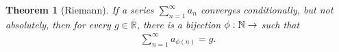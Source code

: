 \documentclass[11pt]{book}
\newtheorem{theorem}{Theorem}[chapter]
\theoremstyle{definition}
\numberwithin{equation}{chapter}
\begin{document}
\medskip

\begin{theorem}[Riemann]
If a series $\sum^\infty_{n=1} a_n$ converges conditionally, but not absolutely, then for every $g \in \overline{\mathbb{R}}$, there is a bijection $\phi: \mathbb{N} \to \markright{N}$ such that
\begin{align*}
    \sum^\infty_{n=1} a_{\phi(n)} = g.
\end{align*}
\end{theorem}













\newpage


\end{document}
